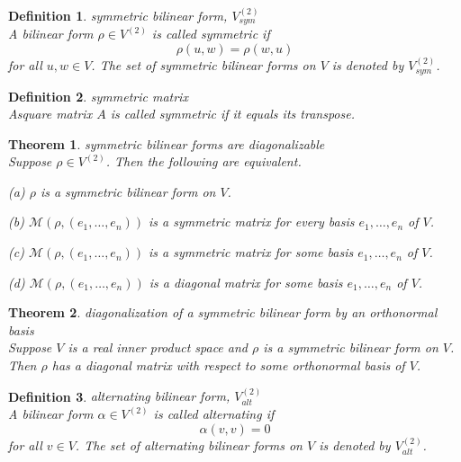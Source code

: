 \documentclass{article}
\newtheorem{theorem}{Theorem}[subsection]
\newtheorem{definition}{Definition}[subsection]
\begin{document}
\begin{CJK}{UTF8}{gkai}
\begin{definition}
    symmetric bilinear form, $V^{(2)}_{sym}$\\

    A bilinear form $\rho \in V^{(2)}$ is called symmetric if
    \[\rho(u,w) = \rho(w,u)\]
    for all $u, w \in V$. The set of symmetric bilinear forms on $V$ is denoted by $V^{(2)}_{sym}$.
\end{definition}

\begin{definition}
    symmetric matrix\\

    Asquare matrix $A$ is called symmetric if it equals its transpose.
\end{definition}

\begin{theorem}
    symmetric bilinear forms are diagonalizable\\

    Suppose $\rho \in V^{(2)}$. Then the following are equivalent.

    (a) $\rho$ is a symmetric bilinear form on $V$.

    (b) $\mathcal{M}(\rho,(e_1,\ldots,e_n))$ is a symmetric matrix for every basis $e_1,\ldots,e_n$ of $V$.
    
    (c) $\mathcal{M}(\rho,(e_1,\ldots,e_n))$ is a symmetric matrix for some basis $e_1,\ldots,e_n$ of $V$.

    (d) $\mathcal{M}(\rho,(e_1,\ldots,e_n))$ is a diagonal matrix for some basis $e_1,\ldots,e_n$ of $V$.
\end{theorem}

\begin{theorem}
    diagonalization of a symmetric bilinear form by an orthonormal basis\\

    Suppose $V$ is a real inner product space and $\rho$ is a symmetric bilinear form on $V$. Then $\rho$ has a diagonal matrix with respect to some orthonormal basis of $V$.
\end{theorem}

\begin{definition}
    alternating bilinear form, $V^{(2)}_{alt}$\\

    A bilinear form $\alpha \in V^{(2)}$ is called alternating if 
    \[\alpha(v, v) = 0\]
    for all $v \in V$. The set of alternating bilinear forms on $V$ is denoted by $V^{(2)}_{alt}$. 
\end{definition}


\end{CJK}
\end{document}
